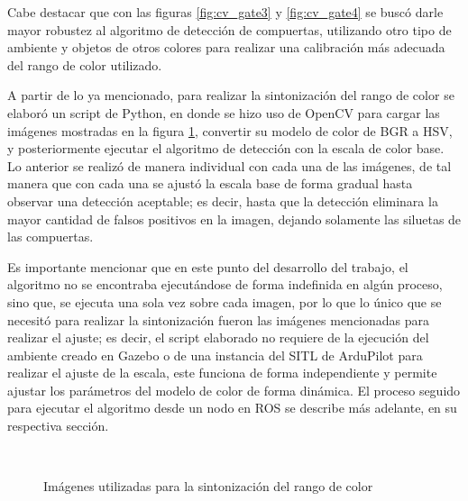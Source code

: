 Cabe destacar que  con las figuras \ref{fig:cv_gate3} y \ref{fig:cv_gate4} se buscó darle mayor robustez al algoritmo de detección de compuertas, utilizando otro tipo de ambiente y objetos de otros colores para realizar una calibración más adecuada del rango de color utilizado.

A partir de lo ya mencionado, para realizar la sintonización del rango de color se elaboró un script de Python, en donde se hizo uso de OpenCV para cargar las imágenes mostradas en la figura \ref{fig:cv_gates}, convertir su modelo de color de BGR a HSV, y posteriormente ejecutar el algoritmo de detección con la escala de color base. Lo anterior se realizó de manera individual con cada una de las imágenes, de tal manera que con cada una se ajustó la escala base de forma gradual hasta observar una detección aceptable; es decir, hasta que la detección eliminara la mayor cantidad de falsos positivos en la imagen, dejando solamente las siluetas de las compuertas. 

Es importante mencionar que en este punto del desarrollo del trabajo, el algoritmo no se encontraba ejecutándose de forma indefinida en algún proceso, sino que, se ejecuta una sola vez sobre cada imagen, por lo que lo único que se necesitó para realizar la sintonización fueron las imágenes mencionadas para realizar el ajuste; es decir, el script elaborado no requiere de la ejecución del ambiente creado en Gazebo o de una instancia del SITL de ArduPilot para realizar el ajuste de la escala, este funciona de forma independiente y permite ajustar los parámetros del modelo de color de forma dinámica. El proceso seguido para ejecutar el algoritmo desde un nodo en ROS se describe más adelante, en su respectiva sección.


\begin{figure}[ht]
    \centering
    \hfill
    \\
    \hfill
    \hfill

    \caption{Imágenes utilizadas para la sintonización del rango de color}
    \label{fig:cv_gates}
\end{figure}

